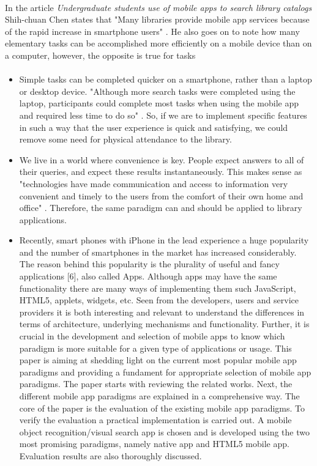 \paragraph{}
 In the article \textit{Undergraduate students use of mobile apps to search library catalogs} Shih-chuan Chen states that "Many libraries provide mobile app services because of the rapid increase in smartphone users" \cite{undergrad_ma}. He also goes on to note how many elementary tasks can be accomplished more efficiently on a mobile device than on a computer, however, the opposite is true for tasks 

\paragraph{}
 
    \begin{itemize}
        \item
        Simple tasks can be completed quicker on a smartphone, rather than a laptop or desktop device. "Although more search tasks were completed using the laptop, participants could complete most tasks when using the mobile app and required less time to do so" \cite{undergrad_ma}. So, if we are to implement specific features in such a way that the user experience is quick and satisfying, we could remove some need for physical attendance to the library.
        \item
        We live in a world where convenience is key. People expect answers to all of their queries, and expect these results instantaneously. This makes sense as "technologies have made communication and access to information very convenient and timely to the users from the comfort of their own home and office" \cite{mob_ph_app_aca_lib}. Therefore, the same paradigm can and should be applied to library applications.
        \item
        Recently, smart phones with iPhone in the lead experience a huge popularity and the number of smartphones in the market has increased considerably. The reason behind this popularity is the plurality of useful and fancy applications [6], also called Apps. Although apps may have the same functionality there are many ways of implementing them such JavaScript, HTML5, applets, widgets, etc. Seen from the developers, users and service providers it is both interesting and relevant to understand the differences in terms of architecture, underlying mechanisms and functionality. Further, it is crucial in the development and selection of mobile apps to know which paradigm is more suitable for a given type of applications or usage. This paper is aiming at shedding light on the current most popular mobile app paradigms and providing a fundament for appropriate selection of mobile app paradigms. The paper starts with reviewing the related works. Next, the different mobile app paradigms are explained in a comprehensive way. The core of the paper is the evaluation of the existing mobile app paradigms. To verify the evaluation a practical implementation is carried out. A mobile object recognition/visual search app is chosen and is developed using the two most promising paradigms, namely native app and HTML5 mobile app. Evaluation results are also thoroughly discussed. \cite{Mobile_App_Paradigms}

\end{itemize}
